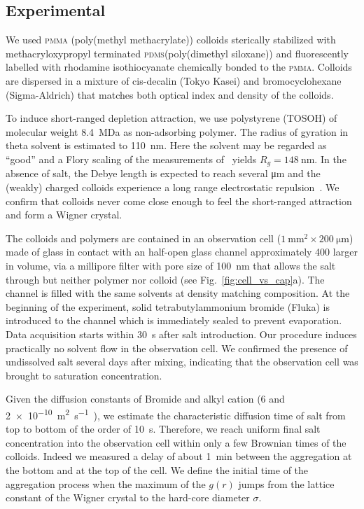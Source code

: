 \subsection*{Experimental}

We used \textsc{pmma} (poly(methyl methacrylate)) colloids sterically stabilized with methacryloxypropyl terminated \textsc{pdms}(poly(dimethyl siloxane)) and fluorescently labelled with rhodamine isothiocyanate chemically bonded to the \textsc{pmma}. Colloids are dispersed in a mixture of cis-decalin (Tokyo Kasei) and bromocyclohexane (Sigma-Aldrich) that matches both optical index and density of the colloids.

To induce short-ranged depletion attraction, we use polystyrene (TOSOH) of molecular weight \SI{8.4}{\mega\dalton} as non-adsorbing polymer. The radius of gyration in theta solvent is estimated to \SI{110}{\nano\metre}. Here the solvent may be regarded as ``good'' and a Flory scaling of the measurements of~\cite{lu2008gelation} yields $R_g=\SI{148}{\nano\metre}$. In the absence of salt, the Debye length is expected to reach several \si{\micro\metre} and the (weakly) charged colloids experience a long range electrostatic repulsion~\cite{Royall2003}. We confirm that colloids never come close enough to feel the short-ranged attraction and form a Wigner crystal.

The colloids and polymers are contained in an observation cell ($\SI{1}{\milli\metre^2} \times \SI{200}{\micro\metre}$) made of glass in contact with an half-open glass channel approximately 400 larger in volume, via a millipore filter with pore size of \SI{100}{\nano\metre} that allows the salt through but neither polymer nor colloid (see Fig.~\ref{fig:cell_vs_cap}a). The channel is filled with the same solvents at density matching composition. At the beginning of the experiment, solid tetrabutylammonium bromide (Fluka) is introduced to the channel which is immediately sealed to prevent evaporation. Data acquisition starts within \SI{30}{\second} after salt introduction. Our procedure induces practically no solvent flow in the observation cell. We confirmed the presence of undissolved salt several days after mixing, indicating that the observation cell was brought to saturation concentration.

Given the diffusion constants of Bromide and alkyl cation ($6$ and \SI{2e-10}{\metre^2\second^{-1}}~\cite{Campbell2005}), we estimate the characteristic diffusion time of salt from top to bottom of the order of \SI{10}{\second}. Therefore, we reach uniform final salt concentration into the observation cell within only a few Brownian times of the colloids. Indeed we measured a delay of about \SI{1}{\minute} between the aggregation at the bottom and at the top of the cell. We define the initial time of the aggregation process when the maximum of the $g(r)$ jumps from the lattice constant of the Wigner crystal to the hard-core diameter $\sigma$.


